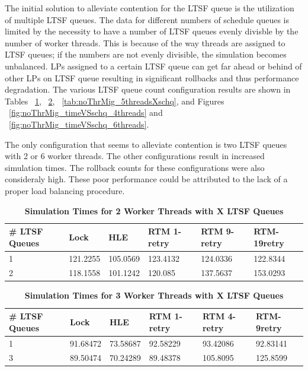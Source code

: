 \documentclass[11pt]{book}
\begin{document}
The initial solution to alleviate contention for the LTSF queue is the
utilization of multiple LTSF queues.  The data for different numbers of schedule
queues is limited by the necessity to have a number of LTSF queues evenly
divisble by the number of worker threads.  This is because of the way threads
are assigned to LTSF queues; if the numbers are not evenly divisible, the
simulation becomes unbalanced.  LPs assigned to a certain LTSF queue can get far
ahead or behind of other LPs on LTSF queue resulting in significant rollbacks
and thus performance degradation.  The various LTSF queue count configuration
results are shown in Tables ~\ref{tab:noThrMig_2threadsXschq},
~\ref{tab:noThrMig_3threadsXschq}, ~\ref{tab:noThrMig_5threadsXschq}, and Figures
~\ref{fig:noThrMig_timeVSschq_4threads} and
~\ref{fig:noThrMig_timeVSschq_6threads}.

The only configuration that seems to alleviate contention is two LTSF queues
with 2 or 6 worker threads.  The other configurations result in increased
simulation times.  The rollback counts for these configurations were also
consideraly high.  These poor performance could be attributed to the lack of a
proper load balancing procedure.\par

\begin{table}[H]
    \centering
    \begin{tabular}{l|p{2cm}|p{2cm}|p{2cm}|p{2cm}|p{2cm}}
        \textbf{\# LTSF Queues}&Lock &HLE &RTM 1-retry &RTM 9-retry &RTM-19retry \\
        \hline
        \midrule
            1 &121.2255  &105.0569 &123.4132  &124.0336 &122.8344 \\ 
            2 &118.1558  &101.1242 &120.085   &137.5637 &153.0293 \\
    \end{tabular}
    \caption{\textbf{Simulation Times for 2 Worker Threads with X LTSF Queues}}
    \label{tab:noThrMig_2threadsXschq}
\end{table}

\begin{table}[H]
    \centering
    \begin{tabular}{l|p{2cm}|p{2cm}|p{2cm}|p{2cm}|p{2cm}}
        \textbf{\# LTSF Queues}&Lock &HLE &RTM 1-retry &RTM 4-retry &RTM-9retry \\
        \hline
        \midrule
            1 &91.68472 &73.58687 &92.58229  &93.42086 &92.83141 \\ 
            3 &89.50474 &70.24289 &89.48378  &105.8095 &125.8599 \\
    \end{tabular}
    \caption{\textbf{Simulation Times for 3 Worker Threads with X LTSF Queues}}
    \label{tab:noThrMig_3threadsXschq}
\end{table}
\end{document}

